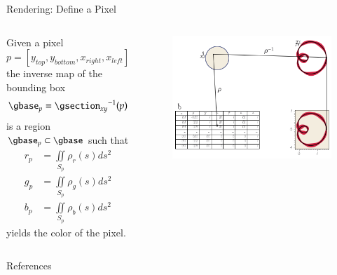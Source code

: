 \documentclass[xcolor={dvipsnames}, handout]{beamer}
\begin{document}
\begin{frame}{Rendering: Define a Pixel}
    \begin{columns}
        Given a pixel
        \begin{equation}
        p=\left[y_{top}, y_{bottom}, x_{right}, x_{left}\right]
        \end{equation}
        the inverse map of the bounding box 
        \begin{equation}
        \gbase_{p} ={\gsection_{xy}}^{-1}(p)
        \end{equation}
        is a region $\gbase_p \subset \gbase$ such that 
        \begin{align}
            \scriptstyle r_p &= \scriptstyle \iint\limits_{S_p} \rho_r(s)ds^{2}\\
            \scriptstyle g_p &= \scriptstyle \iint\limits_{S_p} \rho_g(s)ds^{2}\\
            \scriptstyle  b_p &= \scriptstyle \iint\limits_{S_p} \rho_b(s)ds^{2}
        \end{align}
        yields the color of the pixel. 
        \begin{figure}[H]
            \includegraphics[width=\textwidth]{figures/math/render.png}
        \end{figure}
    \end{columns}
\end{frame}

\begin{frame}[allowframebreaks]{References}
\printbibliography
\end{frame}
\end{document}
